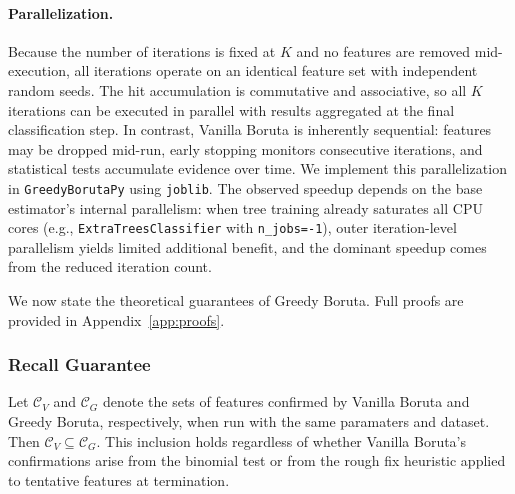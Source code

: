 \documentclass[runningheads]{llncs}
\begin{document}

\paragraph{Parallelization.}
\label{sec:method:parallel}
Because the number of iterations is fixed at $K$ and no features are removed mid-execution, all iterations operate on an identical feature set with independent random seeds. The hit accumulation is commutative and associative, so all $K$ iterations can be executed in parallel with results aggregated at the final classification step. In contrast, Vanilla Boruta is inherently sequential: features may be dropped mid-run, early stopping monitors consecutive iterations, and statistical tests accumulate evidence over time. We implement this parallelization in \texttt{GreedyBorutaPy} using \texttt{joblib}. The observed speedup depends on the base estimator's internal parallelism: when tree training already saturates all CPU cores (e.g., \texttt{ExtraTreesClassifier} with \texttt{n\_jobs=-1}), outer iteration-level parallelism yields limited additional benefit, and the dominant speedup comes from the reduced iteration count.

We now state the theoretical guarantees of Greedy Boruta. Full proofs are provided in Appendix~\ref{app:proofs}.

\subsubsection{Recall Guarantee}

\begin{theorem}
\label{thm:recall}
Let $\mathcal{C}_V$ and $\mathcal{C}_G$ denote the sets of features confirmed by Vanilla Boruta and Greedy Boruta, respectively, when run with the same paramaters and dataset. Then $\mathcal{C}_V \subseteq \mathcal{C}_G$. This inclusion holds regardless of whether Vanilla Boruta's confirmations arise from the binomial test or from the rough fix heuristic applied to tentative features at termination.
\end{theorem}
\end{document}
